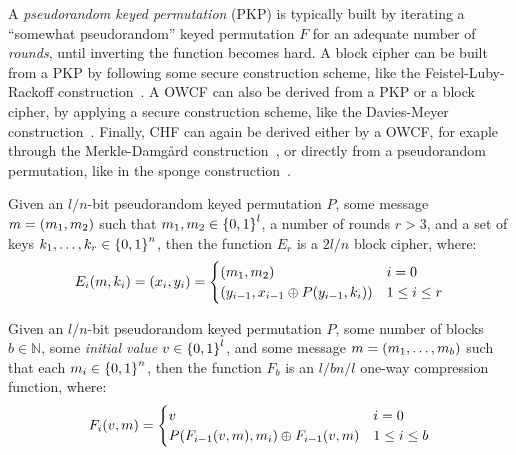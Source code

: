 A \emph{pseudorandom keyed permutation} (PKP) is typically built by iterating a 
``somewhat pseudorandom'' keyed permutation \(F\) for an adequate number of \emph{rounds}, until 
inverting the function becomes hard.
A block cipher can be built from a PKP by following some secure construction scheme, 
like the Feistel-Luby-Rackoff construction~\cite{MenezesOV2001}.
A OWCF can also be derived from a PKP or a block cipher, by applying a secure construction scheme, 
like the Davies-Meyer construction~\cite{Preneel2005}.
Finally, CHF can again be derived either by a OWCF, for exaple through the Merkle-Damg\r{a}rd 
construction~\cite{Merkle1979}, or directly from a pseudorandom permutation, like in the sponge 
construction~\cite{BertoniDPA2007, Tiwari2017}.
\begin{proposition}
	Given an \(l/n\)-bit pseudorandom keyed permutation \(P\), some message
  \(m = \left(m_1, m_2\right)\) such that \(m_1, m_2 \in \left\{0, 1\right\}^l\), a number of rounds 
  \(r > 3\), and a set of keys \(k_1, \dots, k_{r} \in \left\{0, 1\right\}^n\), then the function \(E_{r}\) 
	is a \(2l/n\) block cipher, where:
  \[
		 \call{E_{i}}{m, k_i} = \Tuple{x_i, y_i} = 
		\begin{cases}
			\Tuple{m_1, m_2}                                       & i = 0 \\
			\Tuple{y_{i-1}, x_{i-1} \oplus \call{P}{y_{i-1}, k_i}} & 1 \le i \le r
		\end{cases}
	\]
\end{proposition}

\begin{proposition}
	Given an \(l/n\)-bit pseudorandom keyed permutation \(P\), some number of blocks \(b \in \mathbb{N}\), 
  some \emph{initial value} \(v \in \left\{0, 1\right\}^l\), and some message 
	\(m = \left(m_1, \dots, m_b\right)\) such that each \(m_i \in \left\{0, 1\right\}^{n}\), then the function 
	\(F_{b}\) is an \(l/{bn}/l\) one-way compression function, where:
  \[
		\call{F_{i}}{v, m} =
		\begin{cases}
			v                                													& i = 0 \\
			\call{P}{\call{F_{i-1}}{v, m}, m_i} \oplus \call{F_{i-1}}{v, m} & 1 \le i \le b \\
		\end{cases}
	\]
\end{proposition}

